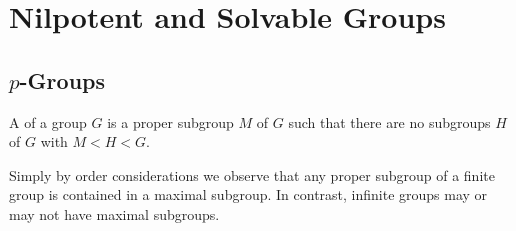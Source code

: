 \chapter{\textsection\textsection Nilpotent and Solvable Groups}

\section{\textsection $p$-Groups}

\begin{defn}
    A  of a group $G$ is a proper subgroup $M$ of $G$ such that there are no subgroups $H$ of $G$ with $M < H < G$.
\end{defn}

Simply by order considerations we observe that any proper subgroup of a finite group is contained in a maximal subgroup. In contrast, infinite groups may or may not have maximal subgroups. 

